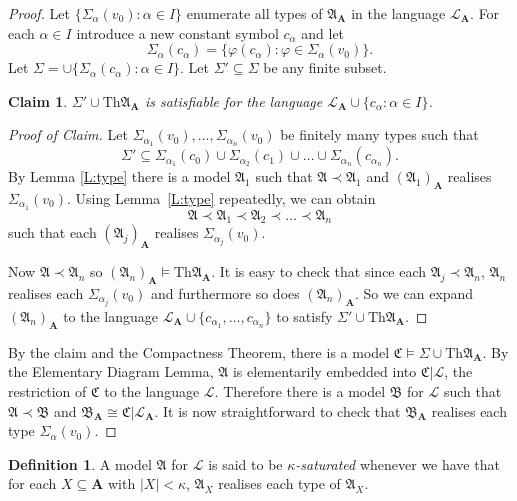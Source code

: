 \documentclass[titlepage, oneside]{amsbook}
\theoremstyle{plain}
\newtheorem*{claim}{Claim}
\theoremstyle{definition}
\newtheorem{definition}{Definition}
\theoremstyle{remark}
\newcommand{\Th}{\ensuremath{\mbox{Th}}}
\newcommand{\lan}{\ensuremath{\mathcal{L}}}
\newcommand{\seq}{\ensuremath{\subseteq}}
\newcommand{\ma}{\ensuremath{\mathfrak{A}}}
\newcommand{\mb}{\ensuremath{\mathfrak{B}}}
\newcommand{\mc}{\ensuremath{\mathfrak{C}}}
\newcommand{\ba}{\ensuremath{\mathbf{A}}}
\newcommand{\vp}{\ensuremath{\varphi}}
\begin{document}
\begin{proof} Let $\{ \Sigma_\alpha ( v_0 ) : \alpha \in I \}$
enumerate all types of $\ma_\ba$ in the language $\lan_\ba$.  For each
$\alpha \in I$ introduce a new constant symbol $c_\alpha$ and let
\[\Sigma_\alpha ( c_\alpha ) = \{ \vp (c_\alpha ) : \vp \in
\Sigma_\alpha (v_0) \}.\]  Let $\Sigma = \cup \{ \Sigma_\alpha (
c_\alpha ) : \alpha \in I \}$. Let $\Sigma' \seq \Sigma$ be any finite
subset. 

\begin{claim}  $\Sigma' \cup \Th \ma_\ba$ is satisfiable for the
language $\lan_\ba \cup \{ c_\alpha : \alpha \in I \}$.
\end{claim}

\begin{proof}[Proof of Claim]  Let $\Sigma_{\alpha_1} (v_0), \dots ,
\Sigma_{\alpha_n}(v_0)$ be finitely many types such that \[ \Sigma'
\seq \Sigma_{\alpha_1}(c_0) \cup \Sigma_{\alpha_2} (c_1)\cup \dots \cup
\Sigma_{\alpha_n}(c_{\alpha_n}). \]
By Lemma \ref{L:type} there is a model $\ma_1$ such that $\ma \prec
\ma_1$ and $(\ma_1)_\ba$ realises $\Sigma_{\alpha_1} (v_0)$.  Using
Lemma~\ref{L:type} repeatedly, we can obtain \[ \ma \prec \ma_1 \prec
\ma_2 \prec \dots \prec \ma_n \]
such that each $(\ma_j)_\ba$ realises $\Sigma_{\alpha_j}(v_0)$.

Now $\ma \prec \ma_n$ so $(\ma_n )_\ba \models \Th \ma_\ba$.  It is
easy to check that since each $\ma_j \prec \ma_n$, $\ma_n$ realises
each $\Sigma_{\alpha_j}(v_0)$ and furthermore so does $(\ma_n)_\ba$.
So we can expand $(\ma_n)_\ba$ to the language $\lan_\ba \cup \{
c_{\alpha_1}, \dots , c_{\alpha_n} \} $ to satisfy $\Sigma' \cup \Th
\ma_\ba$.

\renewcommand{\qedsymbol}{}
\end{proof}

By the claim and the Compactness Theorem, there is a model $\mc \models
\Sigma \cup \Th \ma_\ba$.  By the Elementary Diagram Lemma, $\ma$ is
elementarily embedded into $\mc | \lan$, the restriction of $\mc$ to
the language $\lan$.  Therefore there is a model $\mb$ for $\lan$ such
that $\ma \prec \mb$ and $\mb_\ba \cong \mc | \lan_\ba$.  It is now
straightforward to check that $\mb_\ba$ realises each type
$\Sigma_\alpha (v_0)$.

\end{proof}

\begin{definition}
%
 A model $\ma$ for $\lan$ is said to be
\emph{$\kappa$-saturated } whenever we have that for each $X \seq
\mathbf A$ with  $|X| < 
\kappa$, $\ma_X$ realises each type of $\ma_X$.
\end{definition}
\end{document}
